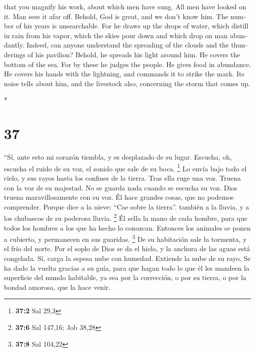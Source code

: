 \begin{paracol}{2}
\begin{otherlanguage}{english}
that you magnify his work, about which men have sung. 
All men have looked on it. Man sees it afar off.  Behold,
God is great, and we don't know him. The number of his years is
unsearchable.  For he draws up the drops of water, which
distill in rain from his vapor,  which the skies pour
down and which drop on man abundantly.  Indeed, can
anyone understand the spreading of the clouds and the thunderings of his
pavilion?  Behold, he spreads his light around him. He
covers the bottom of the sea.  For by these he judges the
people. He gives food in abundance.  He covers his hands
with the lightning, and commands it to strike the mark. 
Its noise tells about him, and the livestock also, concerning the storm
that comes up.

\end{otherlanguage}

\switchcolumn[0]*

\hypertarget{section-72}{%
\section{37}\label{section-72}}

 ``Sí, ante esto mi corazón tiembla, y es desplazado de su
lugar.  Escucha, oh, escucha el ruido de su voz, el sonido
que sale de su boca. \footnote{\textbf{37:2} Sal 29,3}  Lo
envía bajo todo el cielo, y sus rayos hasta los confines de la tierra.
 Tras ella ruge una voz. Truena con la voz de su majestad.
No se guarda nada cuando se escucha su voz.  Dios truena
maravillosamente con su voz. Él hace grandes cosas, que no podemos
comprender.  Porque dice a la nieve: ``Cae sobre la
tierra''. también a la lluvia, y a los chubascos de su poderosa lluvia.
\footnote{\textbf{37:6} Sal 147,16; Job 38,28}  Él sella
la mano de cada hombre, para que todos los hombres a los que ha hecho lo
conozcan.  Entonces los animales se ponen a cubierto, y
permanecen en sus guaridas. \footnote{\textbf{37:8} Sal 104,22}
 De su habitación sale la tormenta, y el frío del norte.
 Por el soplo de Dios se da el hielo, y la anchura de las
aguas está congelada.  Sí, carga la espesa nube con
humedad. Extiende la nube de su rayo.  Se ha dado la
vuelta gracias a su guía, para que hagan todo lo que él les mandeen la
superficie del mundo habitable,  ya sea por la
corrección, o por su tierra, o por la bondad amorosa, que la hace venir.


\end{paracol}
